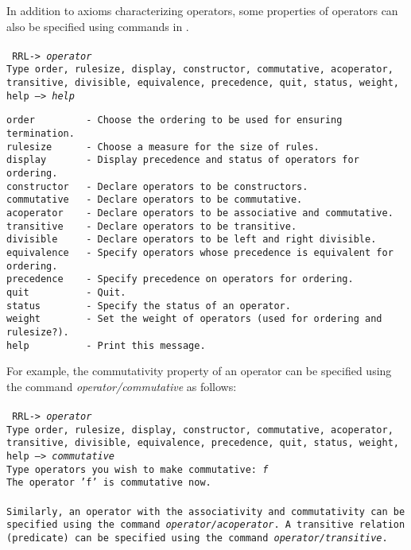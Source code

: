 In addition to axioms characterizing operators,
some properties of operators can also be
specified using commands in \ERRL. \\ \\
\tt 
RRL-> {\em operator} \\
Type order, rulesize, display, constructor, commutative, acoperator, \\
\hspace*{0.4in}
     transitive, divisible, equivalence, precedence, quit, status, weight, \\
\hspace*{0.4in}
     help --> \em help
\begin{verbatim}
order         - Choose the ordering to be used for ensuring termination.
rulesize      - Choose a measure for the size of rules.
display       - Display precedence and status of operators for ordering.
constructor   - Declare operators to be constructors.
commutative   - Declare operators to be commutative.
acoperator    - Declare operators to be associative and commutative.
transitive    - Declare operators to be transitive.
divisible     - Declare operators to be left and right divisible.
equivalence   - Specify operators whose precedence is equivalent for ordering.
precedence    - Specify precedence on operators for ordering.
quit          - Quit.
status        - Specify the status of an operator.
weight        - Set the weight of operators (used for ordering and rulesize?).
help          - Print this message.
\end{verbatim}
\rm
For example,
the commutativity property of an operator can be
specified using the command {\em operator/commutative} as follows: \\ \\
\tt
RRL-> {\em operator}\\
Type order, rulesize, display, constructor, commutative, acoperator, \\
\hspace*{0.4in}
     transitive, divisible, equivalence, precedence, quit, status, weight, \\
\hspace*{0.4in}
     help --> {\em commutative} \\
Type operators you wish to make commutative: {\em f}\\
The operator 'f' is commutative now.\\ \\
\rm
Similarly, an operator with the associativity and commutativity can be
specified using the command {\em operator/acoperator}. 
A transitive relation
(predicate) can be specified using the command {\em operator/transitive}.
  
